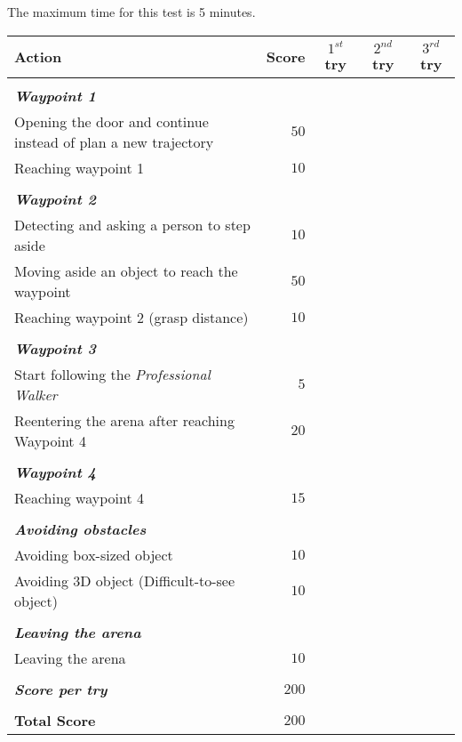
The maximum time for this test is 5 minutes.

\begin{tabularx}{\textwidth}{X r c c c }

	\textbf{Action} & \textbf{Score} & \textbf{$1^{st}$ try} & \textbf{$2^{nd}$ try} & \textbf{$3^{rd}$ try} \\ \hline
	& & & & \\ 
	\textit{\textbf{Waypoint 1}} \\
	Opening the door and continue instead of plan a new trajectory & $50$ & \hrulefill & \hrulefill & \hrulefill \\
	Reaching waypoint 1 & $10$ & \hrulefill & \hrulefill & \hrulefill \\
	& & & & \\ 
	\textit{\textbf{Waypoint 2}} \\
	Detecting and asking a person to step aside & $10$ & \hrulefill & \hrulefill & \hrulefill \\
	Moving aside an object to reach the waypoint & $50$ & \hrulefill & \hrulefill & \hrulefill \\
	Reaching waypoint 2 (grasp distance) & $10$ & \hrulefill & \hrulefill & \hrulefill \\ 
	& & & & \\ 
	\textit{\textbf{Waypoint 3}} \\
	Start following the \textit{Professional Walker} & $5$ & \hrulefill & \hrulefill & \hrulefill \\
	Reentering the arena after reaching Waypoint 4 & $20$ & \hrulefill & \hrulefill & \hrulefill \\
	& & & & \\ 
	\textit{\textbf{Waypoint 4}} \\
	Reaching waypoint 4 & $15$ & \hrulefill & \hrulefill & \hrulefill \\
	& & & & \\ 
	\textit{\textbf{Avoiding obstacles}} \\
	Avoiding box-sized object & $10$ & \hrulefill & \hrulefill & \hrulefill \\
	Avoiding 3D object (Difficult-to-see object) & $10$ & \hrulefill & \hrulefill & \hrulefill \\
	& & & & \\
	\textit{\textbf{Leaving the arena}} \\
	Leaving the arena & $ 10 $ & \hrulefill & \hrulefill & \hrulefill \\ \hline
	& & & & \\ 
	\textit{\textbf{Score per try}} & $200$ & \hrulefill & \hrulefill & \hrulefill \\ 
	& & & & \\ 
	\textbf{Total Score} & $200$ & & & \\ \cline{3-5}

\end{tabularx}\\


